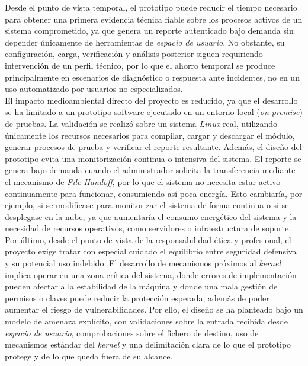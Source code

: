 Desde el punto de vista temporal, el prototipo puede reducir el tiempo necesario para obtener una primera evidencia técnica fiable sobre los procesos activos de un sistema comprometido, ya que genera un reporte autenticado bajo demanda sin depender únicamente de herramientas de \textit{espacio de usuario}.
No obstante, su configuración, carga, verificación y análisis posterior siguen requiriendo intervención de un perfil técnico, por lo que el ahorro temporal se produce principalmente en escenarios de diagnóstico o respuesta ante incidentes, no en un uso automatizado por usuarios no especializados.\\

El impacto medioambiental directo del proyecto es reducido, ya que el desarrollo se ha limitado a un prototipo software ejecutado en un entorno local (\textit{on-premise}) de pruebas.
La validación se realizó sobre un sistema \textit{Linux} real, utilizando únicamente los recursos necesarios para compilar, cargar y descargar el módulo, generar procesos de prueba y verificar el reporte resultante.
Además, el diseño del prototipo evita una monitorización continua o intensiva del sistema.
El reporte se genera bajo demanda cuando el administrador solicita la transferencia mediante el mecanismo de \textit{File Handoff}, por lo que el sistema no necesita estar activo continuamente para funcionar, consumiendo así poca energía.
Esto cambiaría, por ejemplo, si se modificase para monitorizar el sistema de forma continua o si se desplegase en la nube, ya que aumentaría el consumo energético del sistema y la necesidad de recursos operativos, como servidores o infraestructura de soporte.\\

Por último, desde el punto de vista de la responsabilidad ética y profesional, el proyecto exige tratar con especial cuidado el equilibrio entre seguridad defensiva y su potencial uso indebido.
El desarrollo de mecanismos próximos al \textit{kernel} implica operar en una zona crítica del sistema, donde errores de implementación pueden afectar a la estabilidad de la máquina y donde una mala gestión de permisos o claves puede reducir la protección esperada, además de poder aumentar el riesgo de vulnerabilidades.
Por ello, el diseño se ha planteado bajo un modelo de amenaza explícito, con validaciones sobre la entrada recibida desde \textit{espacio de usuario}, comprobaciones sobre el fichero de destino, uso de mecanismos estándar del \textit{kernel} y una delimitación clara de lo que el prototipo protege y de lo que queda fuera de su alcance.\\

